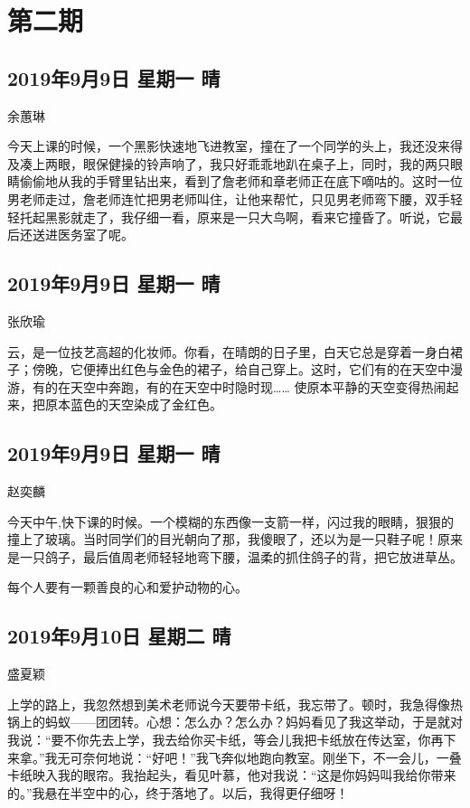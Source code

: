 \chapter{第二期}

\section{2019年9月9日 星期一 晴}

余蕙琳

今天上课的时候，一个黑影快速地飞进教室，撞在了一个同学的头上，我还没来得及凑上两眼，眼保健操的铃声响了，我只好乖乖地趴在桌子上，同时，我的两只眼睛偷偷地从我的手臂里钻出来，看到了詹老师和章老师正在底下嘀咕的。这时一位男老师走过，詹老师连忙把男老师叫住，让他来帮忙，只见男老师弯下腰，双手轻轻托起黑影就走了，我仔细一看，原来是一只大鸟啊，看来它撞昏了。听说，它最后还送进医务室了呢。

\section{2019年9月9日 星期一 晴}

张欣瑜

云，是一位技艺高超的化妆师。你看，在晴朗的日子里，白天它总是穿着一身白裙子；傍晚，它便捧出红色与金色的裙子，给自己穿上。这时，它们有的在天空中漫游，有的在天空中奔跑，有的在天空中时隐时现…… 使原本平静的天空变得热闹起来，把原本蓝色的天空染成了金红色。

\section{2019年9月9日 星期一 晴}

赵奕麟

今天中午,快下课的时候。一个模糊的东西像一支箭一样，闪过我的眼睛，狠狠的撞上了玻璃。当时同学们的目光朝向了那，我傻眼了，还以为是一只鞋子呢！原来是一只鸽子，最后值周老师轻轻地弯下腰，温柔的抓住鸽子的背，把它放进草丛。

每个人要有一颗善良的心和爱护动物的心。

\section{2019年9月10日 星期二 晴}

盛夏颖

上学的路上，我忽然想到美术老师说今天要带卡纸，我忘带了。顿时，我急得像热锅上的蚂蚁——团团转。心想：怎么办？怎么办？妈妈看见了我这举动，于是就对我说：“要不你先去上学，我去给你买卡纸，等会儿我把卡纸放在传达室，你再下来拿。”我无可奈何地说：“好吧！”我飞奔似地跑向教室。刚坐下，不一会儿，一叠卡纸映入我的眼帘。我抬起头，看见叶慕，他对我说：“这是你妈妈叫我给你带来的。”我悬在半空中的心，终于落地了。以后，我得更仔细呀！

